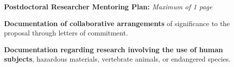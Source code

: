 \renewcommand{\thepage}{Mentoring - Page \arabic{page} of 2}
\textbf{Postdoctoral Researcher Mentoring Plan: }
\emph{Maximum of 1 page}

\smallskip

\bigskip
\textbf{Documentation of collaborative arrangements} of significance to the
proposal through letters of commitment.

\smallskip

\bigskip
\textbf{Documentation regarding research involving the use of human subjects}, hazardous
materials, vertebrate animals, or endangered species.
